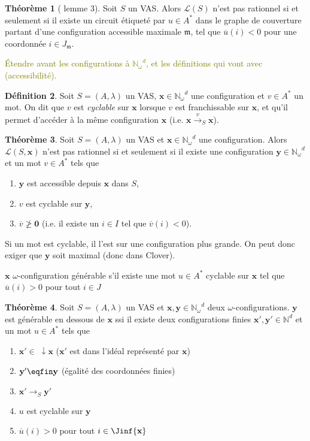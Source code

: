 \documentclass[a4paper,final]{article}
\theoremstyle{definition}
\newtheorem{Theorem}{Théorème}
\newtheorem{Definition}[Theorem]{Définition}
\let\geq\geqslant
\newcommand{\lucas}[1]{\textcolor{olive}{#1}}
\newcommand{\N}{\ensuremath{\mathbb{N}}}
\newcommand{\Nomega}{\ensuremath{\mathbb{N}_\omega}}
\newcommand{\lang}{\ensuremath{\mathcal{L}}}
\newcommand{\trans}[2]{\ensuremath{\stackrel{#1}{\longrightarrow}_{#2}}}
\newcommand{\vect}[1]{\ensuremath{\mathbf{#1}}}
\newcommand{\valeur}[1]{\ensuremath{\overline{#1}}}
\begin{document}
\begin{Theorem}[\cite{vavn81} lemme 3]
Soit $S$ un VAS.
Alors $\lang(S)$ n'est pas rationnel si et seulement si
il existe un circuit étiqueté par $u\in A^*$ dans le graphe de couverture partant d'une configuration accessible maximale $\mathfrak{m}$, 
tel que $\valeur{u}(i) < 0$ pour une coordonnée $i\in J_\mathfrak{m}$.
\end{Theorem}


\lucas{Étendre avant les configurations à $\Nomega^d$, et les définitions qui vont avec (accessibilité).}

\begin{Definition}
Soit $S = (A,\lambda)$ un VAS, $\vect{x}\in\Nomega^d$ une configuration et $v\in A^*$ un mot.
On dit que $v$ est \emph{cyclable} sur $\vect{x}$ lorsque $v$ est franchissable sur $\vect{x}$, et qu'il permet d'accéder à la même configuration $\vect{x}$ (i.e. $\vect{x} \trans{v}{S} \vect{x}$).
\end{Definition}

\begin{Theorem}
Soit $S = (A,\lambda)$ un VAS et $\vect{x}\in\Nomega^d$ une configuration.
Alors $\lang(S,\vect{x})$ n'est pas rationnel si et seulement si
il existe une configuration $\vect{y}\in\Nomega^d$ et un mot $v\in A^*$ tels que
\begin{enumerate}
    \item $\vect{y}$ est accessible depuis $\vect{x}$ dans $S$,
    \item $v$ est cyclable sur $\vect{y}$,
    \item $\valeur{v} \not\geq \vect{0}$ (i.e. il existe un $i\in I$ tel que $\valeur{v}(i)<0$).
\end{enumerate}
\end{Theorem}

Si un mot est cyclable, il l'est sur une configuration plus grande.
On peut donc exiger que $\vect{y}$ soit maximal (donc dans Clover).


$\vect{x}$ $\omega$-configuration générable s'il existe une mot $u\in A^*$ cyclable sur $\vect{x}$ tel que $\valeur{u}(i) > 0$ pour tout $i\in J$ %

\begin{Theorem}
Soit $S = (A,\lambda)$ un VAS et $\vect{x},\vect{y}\in\Nomega^d$ deux $\omega$-configurations.
$\vect{y}$ est générable en dessous de $\vect{x}$ 
ssi il existe deux configurations finies $\vect{x'},\vect{y'}\in\N^d$ et un mot $u\in A^*$ tels que
\begin{enumerate}
    \item $\vect{x'} \in\; \downarrow\vect{x}$ ($\vect{x'}$ est dans l'idéal représenté par $\vect{x}$)
    \item $\vect{y'} \eqfin \vect{y}$ (égalité des coordonnées finies)
    \item $\vect{x'} \trans{}{S} \vect{y'}$
    \item $u$ est cyclable sur $\vect{y}$
    \item $\valeur{u}(i) > 0$ pour tout $i\in \Jinf{\vect{x}}$
\end{enumerate}
\end{Theorem}
\end{document}
